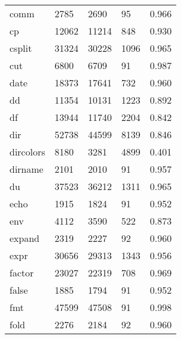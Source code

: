 \begin{longtable}{lp{3.0cm}p{3.0cm}p{3.0cm}p{3.0cm}}
comm      &                     2785 &         2690 &            95 &                    0.966 \\
cp        &                    12062 &        11214 &           848 &                    0.930 \\
csplit    &                    31324 &        30228 &          1096 &                    0.965 \\
cut       &                     6800 &         6709 &            91 &                    0.987 \\
date      &                    18373 &        17641 &           732 &                    0.960 \\
dd        &                    11354 &        10131 &          1223 &                    0.892 \\
df        &                    13944 &        11740 &          2204 &                    0.842 \\
dir       &                    52738 &        44599 &          8139 &                    0.846 \\
dircolors &                     8180 &         3281 &          4899 &                    0.401 \\
dirname   &                     2101 &         2010 &            91 &                    0.957 \\
du        &                    37523 &        36212 &          1311 &                    0.965 \\
echo      &                     1915 &         1824 &            91 &                    0.952 \\
env       &                     4112 &         3590 &           522 &                    0.873 \\
expand    &                     2319 &         2227 &            92 &                    0.960 \\
expr      &                    30656 &        29313 &          1343 &                    0.956 \\
factor    &                    23027 &        22319 &           708 &                    0.969 \\
false     &                     1885 &         1794 &            91 &                    0.952 \\
fmt       &                    47599 &        47508 &            91 &                    0.998 \\
fold      &                     2276 &         2184 &            92 &                    0.960 \\

\end{longtable}
